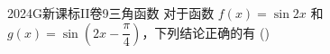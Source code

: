 
\begin{problem}{2024}{G}{新课标II卷}{9}{三角函数}
对于函数 $f(x)=\sin 2x$ 和 $g(x)=\sin\left(2x-\dfrac{\pi}{4}\right)$，下列结论正确的有
(\hspace{1cm})
\begin{choices}
\end{choices}
\end{problem}